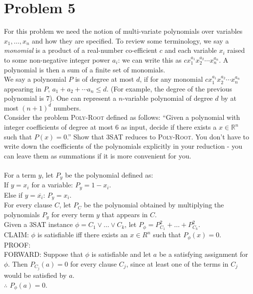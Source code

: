 \documentclass[10pt,letterpaper]{article}
\newcommand\tab[1][0.5cm]{\hspace*{#1}}
\begin{document}
\section{Problem 5}
For this problem we need the notion of multi-variate polynomials over variables $x_1,\ldots,x_n$ and how they are specified. To review some terminology, we say a \emph{monomial} is a product of a real-number co-efficient $c$ and each variable $x_i$ raised to some non-negative integer power $a_i$: we can write this as $c x_1^{a_1} x_2^{a_2} \cdots x_n^{a_n}$. A polynomial is then a sum of a finite set of monomials.\\
We say a polynomial  $P$ is of degree at most $d$, if for any monomial $c x_1^{a_1} x_2^{a_2} \cdots x_n^{a_n}$ appearing in $P$, $a_1 + a_2 + \cdots a_n \leq d$. (For example, the degree of the previous polynomial is $7$). One can represent a $n$-variable polynomial of degree $d$ by at most $(n+1)^d$ numbers.\\
Consider the problem \textsc{Poly-Root} defined as follows: ``Given a polynomial with integer coefficients of degree at most $6$ as input, decide if there exists a $x \in \mathbb{R}^n$ such that $P(x) = 0$.'' Show that 3SAT reduces to \textsc{Poly-Root}. You don't have to write down the coefficients of the polynomials explicitly in your reduction - you can leave them as summations if it is more convenient for you.\\\\
For a term $y$, let $P_y$ be the polynomial defined as:\\
If $y=x_i$ for a variable: $P_y=1-x_i$.\\
Else if $y=\overline{x_i}$: $P_y=x_i$.\\
For every clause $C$, let $P_C$ be the polynomial obtained by multiplying the polynomials $P_y$ for every term $y$ that appears in $C$.\\
Given a \textsc{3SAT} instance $\phi = C_1 \vee \dots \vee C_k$, let $P_{\phi} = P_{C_1}^2 + \dots + P_{C_k}^2$.\\
\textsc{CLAIM}: $\phi$ is satisfiable iff there exists an $x \in R^n$ such that $P_{\phi}(x)=0$.\\
\textsc{PROOF}:\\
\tab \textsc{FORWARD}: Suppose that $\phi$ is satisfiable and let $a$ be a satisfying assignment for $\phi$. Then $P_{C_j}(a)=0$ for every clause $C_j$, since at least one of the terms in $C_j$ would be satisfied by $a$.\\
\tab $\therefore$ $P_{\phi}(a)=0$.\\
\end{document}

